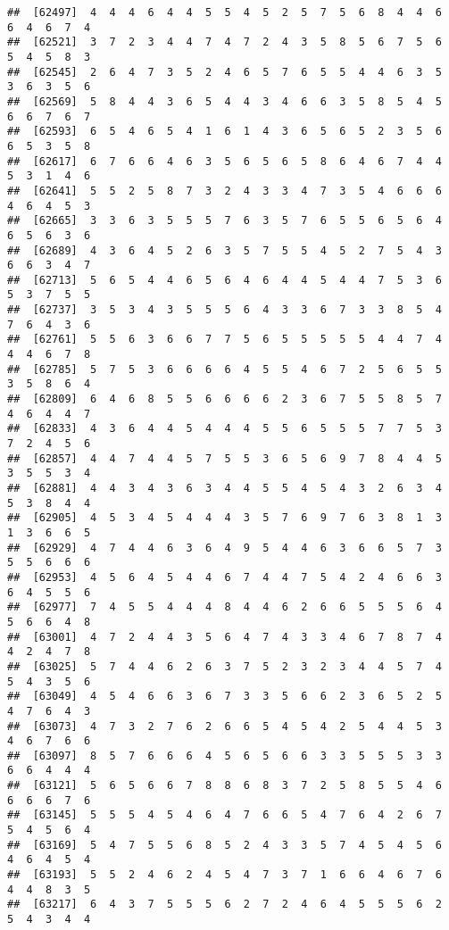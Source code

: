 \documentclass[
]{book}
\begin{document}
\begin{verbatim}
##  [62497]  4  4  4  6  4  4  5  5  4  5  2  5  7  5  6  8  4  4  6  6  4  6  7  4
##  [62521]  3  7  2  3  4  4  7  4  7  2  4  3  5  8  5  6  7  5  6  5  4  5  8  3
##  [62545]  2  6  4  7  3  5  2  4  6  5  7  6  5  5  4  4  6  3  5  3  6  3  5  6
##  [62569]  5  8  4  4  3  6  5  4  4  3  4  6  6  3  5  8  5  4  5  6  6  7  6  7
##  [62593]  6  5  4  6  5  4  1  6  1  4  3  6  5  6  5  2  3  5  6  6  5  3  5  8
##  [62617]  6  7  6  6  4  6  3  5  6  5  6  5  8  6  4  6  7  4  4  5  3  1  4  6
##  [62641]  5  5  2  5  8  7  3  2  4  3  3  4  7  3  5  4  6  6  6  4  6  4  5  3
##  [62665]  3  3  6  3  5  5  5  7  6  3  5  7  6  5  5  6  5  6  4  6  5  6  3  6
##  [62689]  4  3  6  4  5  2  6  3  5  7  5  5  4  5  2  7  5  4  3  6  6  3  4  7
##  [62713]  5  6  5  4  4  6  5  6  4  6  4  4  5  4  4  7  5  3  6  5  3  7  5  5
##  [62737]  3  5  3  4  3  5  5  5  6  4  3  3  6  7  3  3  8  5  4  7  6  4  3  6
##  [62761]  5  5  6  3  6  6  7  7  5  6  5  5  5  5  5  4  4  7  4  4  4  6  7  8
##  [62785]  5  7  5  3  6  6  6  6  4  5  5  4  6  7  2  5  6  5  5  3  5  8  6  4
##  [62809]  6  4  6  8  5  5  6  6  6  6  2  3  6  7  5  5  8  5  7  4  6  4  4  7
##  [62833]  4  3  6  4  4  5  4  4  4  5  5  6  5  5  5  7  7  5  3  7  2  4  5  6
##  [62857]  4  4  7  4  4  5  7  5  5  3  6  5  6  9  7  8  4  4  5  3  5  5  3  4
##  [62881]  4  4  3  4  3  6  3  4  4  5  5  4  5  4  3  2  6  3  4  5  3  8  4  4
##  [62905]  4  5  3  4  5  4  4  4  3  5  7  6  9  7  6  3  8  1  3  1  3  6  6  5
##  [62929]  4  7  4  4  6  3  6  4  9  5  4  4  6  3  6  6  5  7  3  5  5  6  6  6
##  [62953]  4  5  6  4  5  4  4  6  7  4  4  7  5  4  2  4  6  6  3  6  4  5  5  6
##  [62977]  7  4  5  5  4  4  4  8  4  4  6  2  6  6  5  5  5  6  4  5  6  6  4  8
##  [63001]  4  7  2  4  4  3  5  6  4  7  4  3  3  4  6  7  8  7  4  4  2  4  7  8
##  [63025]  5  7  4  4  6  2  6  3  7  5  2  3  2  3  4  4  5  7  4  5  4  3  5  6
##  [63049]  4  5  4  6  6  3  6  7  3  3  5  6  6  2  3  6  5  2  5  4  7  6  4  3
##  [63073]  4  7  3  2  7  6  2  6  6  5  4  5  4  2  5  4  4  5  3  4  6  7  6  6
##  [63097]  8  5  7  6  6  6  4  5  6  5  6  6  3  3  5  5  5  3  3  6  6  4  4  4
##  [63121]  5  6  5  6  6  7  8  8  6  8  3  7  2  5  8  5  5  4  6  6  6  6  7  6
##  [63145]  5  5  5  4  5  4  6  4  7  6  6  5  4  7  6  4  2  6  7  5  4  5  6  4
##  [63169]  5  4  7  5  5  6  8  5  2  4  3  3  5  7  4  5  4  5  6  4  6  4  5  4
##  [63193]  5  5  2  4  6  2  4  5  4  7  3  7  1  6  6  4  6  7  6  4  4  8  3  5
##  [63217]  6  4  3  7  5  5  5  6  2  7  2  4  6  4  5  5  5  6  2  5  4  3  4  4

\end{verbatim}
\end{document}
